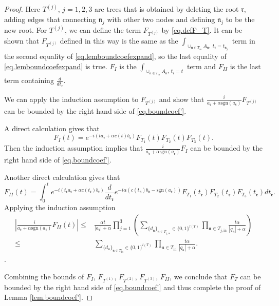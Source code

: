 \begin{proof}
Here $T^{(j)}$, $j=1,2,3$ are trees that is obtained by deleting the root $\mathfrak{r}$, adding edges that connecting $\mathfrak{n}_j$ with other two nodes and defining $\mathfrak{n}_j$ to be the new root. For $T^{(j)}$, we can define the term $F_{T^{(j)}}$ by \eqref{eq.defF_T}. It can be shown that $F_{T^{(j)}}$ defined in this way is the same as the $\int_{\cup_{\mathfrak{n}\in T_{\text{in}}} A_{\mathfrak{n}},\ t_{\mathfrak{r}}=t_{\mathfrak{n}_j}}$ term in the second equality of \eqref{eq.lemboundcoefexpand}, so the last equality of \eqref{eq.lemboundcoefexpand} is true. $F_{I}$ is the $\int_{\cup_{\mathfrak{n}\in T_{\text{in}}} A_{\mathfrak{n}},\ t_{\mathfrak{r}}=t}$ term and $F_{II}$ is the last term containing $\frac{d}{dt_{\mathfrak{r}}}$.

We can apply the induction assumption to $F_{T^{(j)}}$ and show that $\frac{i}{a_{\mathfrak{r}}+\alpha \text{sgn}(a_{\mathfrak{r}})} F_{T^{(j)}}$ can be bounded by the right hand side of \eqref{eq.boundcoef'}.

A direct calculation gives that 
\begin{equation}
    F_{I}(t)=e^{-i(ta_{\mathfrak{r}}+\alpha c(t)b_{\mathfrak{r}})} F_{T_1}(t)F_{T_2}(t)F_{T_3}(t).
\end{equation}
Then the induction assumption implies that $\frac{i}{a_{\mathfrak{r}}+\alpha \text{sgn}(a_{\mathfrak{r}})} F_{I}$ can be bounded by the right hand side of \eqref{eq.boundcoef'}.

Another direct calculation gives that 
\begin{equation}
    F_{II}(t)=\int^t_0 e^{-i(t_{\mathfrak{r}}a_{\mathfrak{r}}+\alpha c(t_{\mathfrak{r}})b_{\mathfrak{r}})} \frac{d}{dt_{\mathfrak{r}}}e^{-i\alpha(c(t_{\mathfrak{n}}) b_{\mathfrak{n}}- \text{sgn}(a_{\mathfrak{r}}))} F_{T_1}(t_{\mathfrak{r}})F_{T_2}(t_{\mathfrak{r}})F_{T_3}(t_{\mathfrak{r}}) dt_{\mathfrak{r}}.
\end{equation}
Applying the induction assumption
\begin{equation}
\begin{split}
    \left| \frac{i}{a_{\mathfrak{r}}+\alpha \text{sgn}(a_{\mathfrak{r}})} F_{II}(t)\right|\le& \frac{\alpha t}{|a_{\mathfrak{r}}|+\alpha}\prod_{j=1}^3\left(\sum_{\{d_{\mathfrak{n}}\}_{\mathfrak{n}\in T_{j,\text{in}}}\in\{0,1\}^{l(T)}}\prod_{\mathfrak{n}\in T_{j,\text{in}}}\frac{t\alpha}{|q_{\mathfrak{n}}|+\alpha}\right)
    \\
    \le& \sum_{\{d_{\mathfrak{n}}\}_{\mathfrak{n}\in T_{\text{in}}}\in\{0,1\}^{l(T)}}\prod_{\mathfrak{n}\in T_{\text{in}}}\frac{t\alpha}{|q_{\mathfrak{n}}|+\alpha}.
\end{split}
\end{equation}.

Combining the bounds of $F_{I}$, $F_{T^{(1)}}$, $F_{T^{(2)}}$, $F_{T^{(3)}}$, $F_{II}$, we conclude that $F_T$ can be bounded by the right hand side of \eqref{eq.boundcoef'} and thus complete the proof of Lemma \ref{lem.boundcoef'}.
\end{proof}
 
